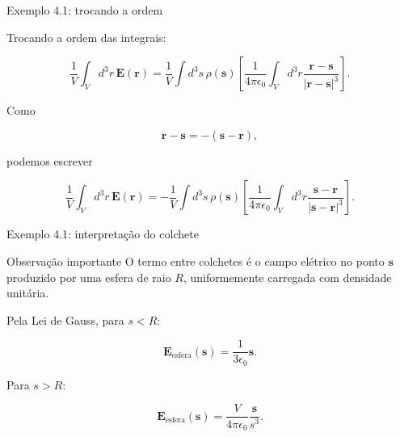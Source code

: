 \documentclass[aspectratio=169]{beamer}
\begin{document}
\begin{frame}{Exemplo 4.1: trocando a ordem}

Trocando a ordem das integrais:

\begin{eqbox}
\begin{equation}
\frac{1}{V}
\int_V d^3r\,\mathbf E(\mathbf r)
=
\frac{1}{V}
\int d^3s\,\rho(\mathbf s)
\left[
\frac{1}{4\pi\epsilon_0}
\int_V d^3r
\frac{\mathbf r-\mathbf s}{|\mathbf r-\mathbf s|^3}
\right].
\label{eq:troca_ordem_exemplo}
\end{equation}
\end{eqbox}

Como

\[
\mathbf r-\mathbf s
=
-(\mathbf s-\mathbf r),
\]

podemos escrever

\begin{eqbox}
\begin{equation}
\frac{1}{V}
\int_V d^3r\,\mathbf E(\mathbf r)
=
-
\frac{1}{V}
\int d^3s\,\rho(\mathbf s)
\left[
\frac{1}{4\pi\epsilon_0}
\int_V d^3r
\frac{\mathbf s-\mathbf r}{|\mathbf s-\mathbf r|^3}
\right].
\label{eq:sinal_menos_exemplo}
\end{equation}
\end{eqbox}

\end{frame}

\begin{frame}{Exemplo 4.1: interpretação do colchete}

\begin{mybox}{Observação importante}
O termo entre colchetes é o campo elétrico no ponto \(\mathbf s\) produzido por uma esfera de raio \(R\), uniformemente carregada com densidade unitária.
\end{mybox}

Pela Lei de Gauss, para \(s<R\):

\begin{eqbox}
\begin{equation}
\mathbf E_{\text{esfera}}(\mathbf s)
=
\frac{1}{3\epsilon_0}\mathbf s.
\label{eq:campo_esfera_interno}
\end{equation}
\end{eqbox}

Para \(s>R\):

\begin{eqbox}
\begin{equation}
\mathbf E_{\text{esfera}}(\mathbf s)
=
\frac{V}{4\pi\epsilon_0}
\frac{\mathbf s}{s^3}.
\label{eq:campo_esfera_externo}
\end{equation}
\end{eqbox}

\end{frame}
\end{document}
